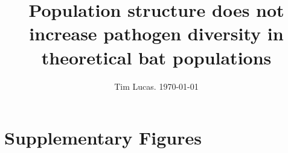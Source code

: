 \documentclass[ltxdoc,10pt,reqno]{amsart}
\begin{document}
\title{Population structure does not increase pathogen diversity in theoretical bat populations}
\author{Tim Lucas. \today}
\date{}

\maketitle





\clearpage
\appendix
\section{Supplementary Figures}






\small
\printbibliography 
\end{document}
